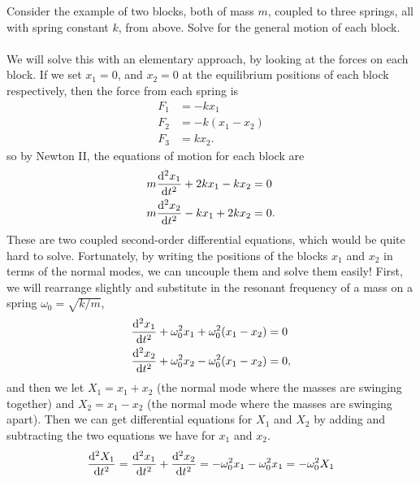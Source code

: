 \documentclass[../classical_mechanics.tex]{subfiles}
\begin{document}
        \begin{example}
            Consider the example of two blocks, both of mass $m$, coupled to three springs, all with spring constant $k$, from above.
            Solve for the general motion of each block.
            
            \paragraph{}
            We will solve this with an elementary approach, by looking at the forces on each block.
            If we set $x_1=0$, and $x_2=0$ at the equilibrium positions of each block respectively, then the force from each spring is
            \begin{align}
                F_1&=-kx_1\\
                F_2&=-k(x_1-x_2)\\
                F_3&=kx_2.
            \end{align}
            so by Newton II, the equations of motion for each block are
            \begin{align}
                &m\dv[2]{x_1}{t}+2kx_1-kx_2=0\\
                &m\dv[2]{x_2}{t}-kx_1+2kx_2=0.
            \end{align}
            These are two coupled second-order differential equations, which would be quite hard to solve.
            Fortunately, by writing the positions of the blocks $x_1$ and $x_2$ in terms of the normal modes, we can uncouple them and solve them easily!
            First, we will rearrange slightly and substitute in the resonant frequency of a mass on a spring $\omega_0=\sqrt{k/m}$,
            \begin{align}
                &\dv[2]{x_1}{t}+\omega_0^2x_1+\omega_0^2(x_1-x_2)=0\\
                &\dv[2]{x_2}{t}+\omega_0^2x_2-\omega_0^2(x_1-x_2)=0,
            \end{align}
            and then we let $X_1=x_1+x_2$ (the normal mode where the masses are swinging together) and $X_2=x_1-x_2$ (the normal mode where the masses are swinging apart).
            Then we can get differential equations for $X_1$ and $X_2$ by adding and subtracting the two equations we have for $x_1$ and $x_2$.
            \begin{align}
                &\dv[2]{X_1}{t}=\dv[2]{x_1}{t}+\dv[2]{x_2}{t}=-\omega_0^2x_1-\omega_0^2x_1=-\omega_0^2X_1\\

\end{align}
\end{example}
\end{document}
